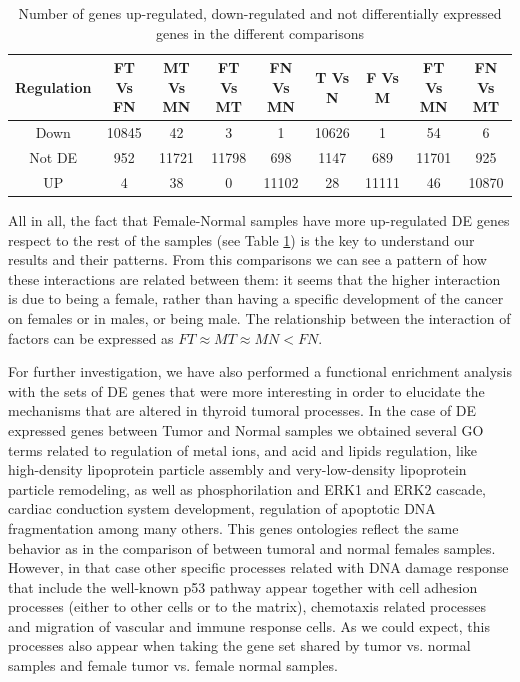 \documentclass[9pt,twocolumn,twoside]{gsajnl}
\begin{document}
\bigskip

\begin{table}[t]
  \centering
  \begin{tabular}{c|cccccccc}
     Regulation & FT Vs FN & MT Vs MN & FT Vs MT & FN Vs MN & T Vs N & F Vs M & FT Vs MN & FN Vs MT \\ \hline
     Down & 10845 & 42 & 3 & 1 & 10626 & 1 & 54 & 6 \\ 
     Not DE & 952 & 11721 & 11798 & 698 & 1147 & 689 & 11701 & 925 \\
     UP & 4 & 38 & 0 & 11102 & 28 & 11111 & 46 & 10870
  \end{tabular}
  \caption{Number of genes up-regulated, down-regulated and not differentially expressed genes in the different comparisons}
  \label{tab:1}
\end{table}

                     
All in all, the fact that Female-Normal samples have more up-regulated DE genes respect to the rest of the samples (see Table \ref{tab:1}) 
is the key to understand our results and their patterns. From this comparisons we can see a pattern of how these interactions are related between them: it seems that the higher interaction is due to being a female, rather than having a specific development of the cancer on females or in males, or being male. The relationship between the interaction of factors can be expressed as $FT \approx MT \approx MN < FN$.

For further investigation, we have also performed a functional enrichment analysis with the sets of DE genes that were more interesting in order to elucidate the mechanisms that are altered in thyroid tumoral processes. In the case of DE expressed genes between Tumor and Normal samples we obtained several GO terms  %
related to regulation of metal ions, and acid and lipids regulation, like high-density lipoprotein particle assembly and very-low-density lipoprotein particle remodeling, as well as phosphorilation and ERK1 and ERK2 cascade, cardiac conduction system development, regulation of apoptotic DNA fragmentation among many others. This genes ontologies reflect the same behavior as in the comparison of between tumoral and normal females samples. %
However, in that case other specific processes related with DNA damage response that include the well-known p53 pathway appear together with cell adhesion processes (either to other cells or to the matrix), chemotaxis related processes and migration of vascular and immune response cells. 
As we could expect, this processes also appear when taking the gene set shared by tumor vs. normal samples and female tumor vs. female normal samples. 
	 	
\end{document}
